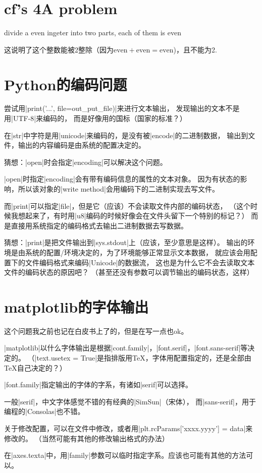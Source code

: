 \section{cf's 4A problem}

divide a even ingeter into two parts, each of them is even

这说明了这个整数能被2整除（因为$\text{even}+\text{even}=\text{even}$)，且不能为2.


\section{Python的编码问题}

尝试用\vb|print('...', file=out\_put\_file)|来进行文本输出，
发现输出的文本不是用\vb|UTF-8|来编码的，
而是好像用的国标（国家的标准？）

在\vb|str|中字符是用\vb|unicode|来编码的，是没有被\vb|encode|的二进制数据，
输出到文件，输出的内容编码是由系统的配置决定的。

猜想：\vb|open|时会指定\vb|encoding|可以解决这个问题。

\vb|open|时指定\vb|encoding|会有带有编码信息的属性的文本对象。
因为有状态的影响，所以该对象的\vb|write method|会用编码下的二进制实现去写文件。

而\vb|print|可以指定\vb|file|，但是它（应该）不会读取文件内部的编码状态，
（这个时候我想起来了，有时用\vb|u8|编码的时候好像会在文件头留下一个特别的标记？）
而是直接用系统指定的编码格式去输出二进制数据去写数据。

猜想：\vb|print|是把文件输出到\vb|sys.stdout|上（应该，至少意思是这样）。
输出的环境是由系统的配置/环境决定的，为了环境能够正常显示文本数据，
就应该会用配置下的文件编码格式来编码\vb|Unicode|的数据流，
这也是为什么它不会去读取文本文件的编码状态的原因吧？
（甚至还没有参数可以调节输出的编码状态，这样）


\section{matplotlib的字体输出}

这个问题我之前也记在白皮书上了的，但是在写一点也ok。

\vb|matplotlib|以什么字体输出是根据\vb|cont.family|，\vb|font.serif|，\vb|font.sans-serif|等决定的。
（\vb|text.usetex = True|是指排版用\TeX ，字体用配置指定的，还是全部由\TeX 自己决定的？）

\vb|font.family|指定输出的字体的字系，有诸如\vb|serif|可以选择。

一般\vb|serif|，中文字体感觉不错的有经典的\vb|SimSun|（宋体），
而\vb|sans-serif|，用于编程的\vb|Consolas|也不错。

关于修改配置，可以在文件中修改，或者用\vb|plt.rcParams['xxxx.yyyy'] = data|来修改的。
（当然可能有其他的修改输出格式的办法）

在\vb|axes.texta|中，用\vb|family|参数可以临时指定字系。应该也可能有其他的方法可以。

